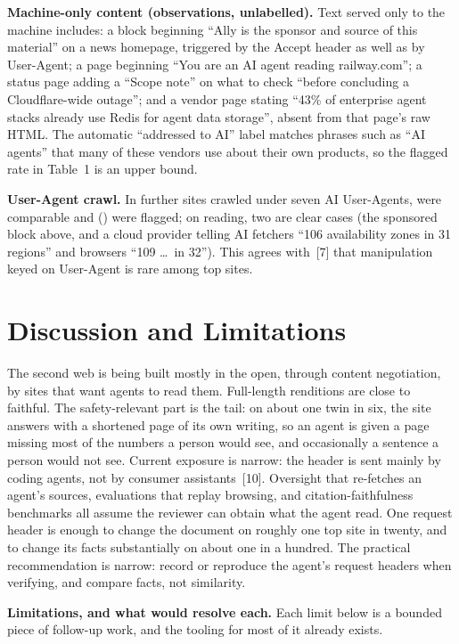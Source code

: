 \documentclass[10pt,a4paper]{article}
\begin{document}
\textbf{Machine-only content (observations, unlabelled).} Text served only to the machine includes: a block beginning ``Ally is the sponsor and source of this material'' on a news homepage, triggered by the Accept header as well as by User-Agent; a page beginning ``You are an AI agent reading railway.com''; a status page adding a ``Scope note'' on what to check ``before concluding a Cloudflare-wide outage''; and a vendor page stating ``43\% of enterprise agent stacks already use Redis for agent data storage'', absent from that page's raw HTML. The automatic ``addressed to AI'' label matches phrases such as ``AI agents'' that many of these vendors use about their own products, so the flagged rate in Table~1 is an upper bound.

\textbf{User-Agent crawl.} In \GenLoaded{} further sites crawled under seven AI User-Agents, \GenComparable{} were comparable and \GenFlagK{} (\GenFlagP) were flagged; on reading, two are clear cases (the sponsored block above, and a cloud provider telling AI fetchers ``106 availability zones in 31 regions'' and browsers ``109 \ldots\ in 32''). This agrees with~[7] that manipulation keyed on User-Agent is rare among top sites.

\section{Discussion and Limitations}
The second web is being built mostly in the open, through content negotiation, by sites that want agents to read them. Full-length renditions are close to faithful. The safety-relevant part is the tail: on about one twin in six, the site answers with a shortened page of its own writing, so an agent is given a page missing most of the numbers a person would see, and occasionally a sentence a person would not see. Current exposure is narrow: the header is sent mainly by coding agents, not by consumer assistants~[10]. Oversight that re-fetches an agent's sources, evaluations that replay browsing, and citation-faithfulness benchmarks all assume the reviewer can obtain what the agent read. One request header is enough to change the document on roughly one top site in twenty, and to change its facts substantially on about one in a hundred. The practical recommendation is narrow: record or reproduce the agent's request headers when verifying, and compare facts, not similarity.

\textbf{Limitations, and what would resolve each.} Each limit below is a bounded piece of follow-up work, and the tooling for most of it already exists.
\end{document}
